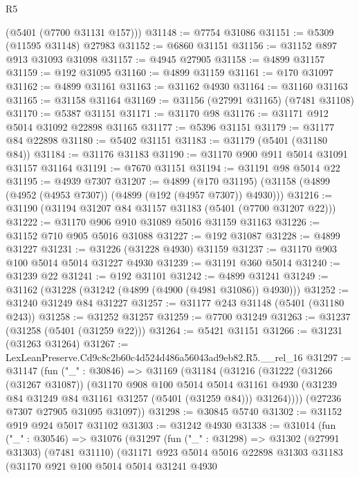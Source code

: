 \begin{lexlean}{R5}
\begin{coremodule}
      (@5401 (@7700 @31131 @157)))
@31148 := @7754 @31086
@31151 := @5309 (@11595 @31148) @27983
@31152 := @6860 @31151
@31156 := @31152 @897 @913 @31093 @31098
@31157 := @4945 @27905
@31158 := @4899 @31157
@31159 := @192 @31095
@31160 := @4899 @31159
@31161 := @170 @31097
@31162 := @4899 @31161
@31163 := @31162 @4930
@31164 := @31160 @31163
@31165 := @31158 @31164
@31169 := @31156 (@27991 @31165) (@7481 @31108)
@31170 := @5387 @31151
@31171 := @31170 @98
@31176 := @31171 @912 @5014 @31092 @22898 @31165
@31177 := @5396 @31151
@31179 := @31177 @84 @22898
@31180 := @5402 @31151
@31183 := @31179 (@5401 (@31180 @84))
@31184 := @31176 @31183
@31190 := @31170 @900 @911 @5014 @31091 @31157 @31164
@31191 := @7670 @31151
@31194 := @31191 @98 @5014 @22
@31195 := @4939 @7307
@31207 := @4899
    (@170 @31195)
    (@31158 (@4899 (@4952 (@4953 @7307)) (@4899 (@192 (@4957 @7307)) @4930)))
@31216 := @31190 (@31194 @31207 @84 @31157 @31183 (@5401 (@7700 @31207 @22)))
@31222 := @31170 @906 @910 @31089 @5016 @31159 @31163
@31226 := @31152 @710 @905 @5016 @31088
@31227 := @192 @31087
@31228 := @4899 @31227
@31231 := @31226 (@31228 @4930) @31159
@31237 := @31170 @903 @100 @5014 @5014 @31227 @4930
@31239 := @31191 @360 @5014
@31240 := @31239 @22
@31241 := @192 @31101
@31242 := @4899 @31241
@31249 := @31162 (@31228 (@31242 (@4899 (@4900 (@4981 @31086)) @4930)))
@31252 := @31240 @31249 @84 @31227
@31257 := @31177 @243 @31148 (@5401 (@31180 @243))
@31258 := @31252 @31257
@31259 := @7700 @31249
@31263 := @31237 (@31258 (@5401 (@31259 @22)))
@31264 := @5421 @31151
@31266 := @31231 (@31263 @31264)
@31267 := LexLeanPreserve.Cd9c8c2b60c4d524d486a56043ad9eb82.R5.__rel_16
@31297 := @31147
    (fun ("_" : @30846) =>
    @31169
      (@31184
        (@31216
          (@31222
            (@31266 (@31267 @31087))
            (@31170
              @908
              @100
              @5014
              @5014
              @31161
              @4930
              (@31239 @84 @31249 @84 @31161 @31257 (@5401 (@31259 @84)))
              @31264))))
      (@27236 @7307 @27905 @31095 @31097))
@31298 := @30845 @5740
@31302 := @31152 @919 @924 @5017 @31102
@31303 := @31242 @4930
@31338 := @31014
    (fun ("_" : @30546) =>
    @31076
      (@31297
        (fun ("_" : @31298) =>
        @31302
          (@27991 @31303)
          (@7481 @31110)
          (@31171
            @923
            @5014
            @5016
            @22898
            @31303
            @31183
            (@31170
              @921
              @100
              @5014
              @5014
              @31241
              @4930

\end{coremodule}
\end{lexlean}
